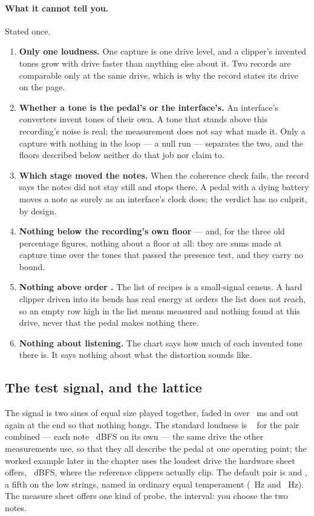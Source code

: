 \documentclass[11pt,a4paper]{article}
\begin{document}
\paragraph{What it cannot tell you.} Stated once.
\begin{enumerate}
  \item \textbf{Only one loudness.} One capture is one drive level, and
  a clipper's invented tones grow with drive faster than anything else
  about it. Two records are comparable only at the same drive, which is
  why the record states its drive on the page.
  \item \textbf{Whether a tone is the pedal's or the interface's.} An
  interface's converters invent tones of their own. A tone that stands
  above this recording's noise is real; the measurement does not say
  what made it. Only a capture with nothing in the loop --- a null run
  --- separates the two, and the floors described below neither do that
  job nor claim to.
  \item \textbf{Which stage moved the notes.} When the coherence check
  fails, the record says the notes did not stay still and stops there. A
  pedal with a dying battery moves a note as surely as an interface's
  clock does; the verdict has no culprit, by design.
  \item \textbf{Nothing below the recording's own floor} --- and, for the
  three old percentage figures, nothing about a floor at all: they are
  sums made at capture time over the tones that passed the presence test,
  and they carry no bound.
  \item \textbf{Nothing above order \imdMaxOrder{}.} The list of recipes
  is a small-signal census. A hard clipper driven into its bends has real
  energy at orders the list does not reach, so an empty row high in the
  list means measured and nothing found at this drive, never that the
  pedal makes nothing there.
  \item \textbf{Nothing about listening.} The chart says how much of each
  invented tone there is. It says nothing about what the distortion sounds like.
\end{enumerate}

\subsection{The test signal, and the lattice}

The signal is two sines of equal size played together, faded in over
\imdFadeMs{}~ms and out again at the end so that nothing bangs. The
standard loudness is \imdPeakDBFS{}~ for the pair combined
--- each note \imdToneDBFS{}~dBFS on its own --- the same drive the other
measurements use, so that they all describe the pedal at one operating
point; the worked example later in the chapter uses the loudest drive the
hardware sheet offers, \tcCeilingDBFS{}~dBFS, where the reference
clippers actually clip. The default pair is \imdNoteOne{} and
\imdNoteTwo{}, a fifth on the low strings, named in ordinary equal
temperament (\imdNoteOneHz{}~Hz and \imdNoteTwoHz{}~Hz). The measure
sheet offers one kind of probe, the interval: you choose the two notes.
\end{document}
